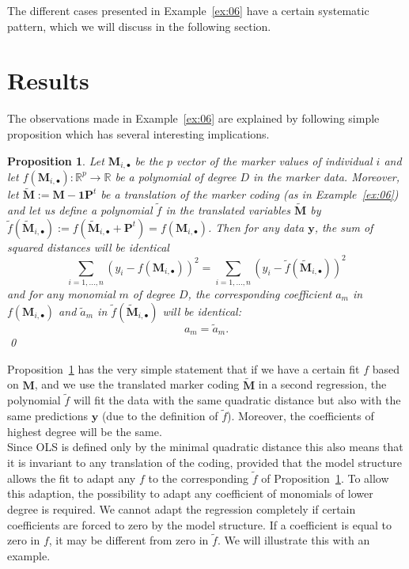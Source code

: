 \documentclass{bmcart}
\newtheorem{proposition}{Proposition}
\newcommand{\M}{\mathbf{M}}
\newcommand{\0}{\mathbf{0}}
\newcommand{\y}{\mathbf{y}}
\renewcommand{\P}{\mathbf{P}}
\begin{document}
The different cases presented in Example~\ref{ex:06} have a certain systematic pattern, which we will discuss in the following section. 


\section*{Results} 
The observations made in Example~\ref{ex:06} are explained by following simple proposition
which has several interesting implications.
\begin{proposition}\label{prop:01} Let $\M_{i,\bullet}$ be the $p$ vector of the marker values of individual $i$ and let $f(\M_{i,\bullet}): \mathbb{R}^p \rightarrow \mathbb{R}$ be a polynomial of degree $D$ in the marker data. Moreover, let $\tilde{\M}:= \M - \mathbf{1} \P^t$ be a translation of the marker coding (as in Example~\ref{ex:06}) and let us define a polynomial $\tilde{f}$ in the translated variables $\tilde{\M}$ by $\tilde{f}(\tilde{\M}_{i,\bullet}):= f(\tilde{\M}_{i,\bullet} +  \P^t)=f(\M_{i,\bullet})$. Then for any data $\y$, the sum of squared distances will be identical 
	$$ \sum_{i=1,...,n} (y_i - f(\M_{i,\bullet}))^2 = \sum_{i=1,...,n} (y_i - \tilde{f}(\tilde{\M}_{i,\bullet}))^2 $$
	and for any monomial $m$ of degree $D$, the corresponding coefficient $a_m$ in $f(\M_{i,\bullet})$ and $\tilde{a}_m$ in $\tilde{f}(\tilde{\M}_{i,\bullet})$ will be identical:
	$$a_m = \tilde{a}_m.$$ \qed
\end{proposition}
Proposition~\ref{prop:01} has the very simple statement that if we have a certain fit $f$ based on $\M$, and we use the translated marker coding $\tilde{\M}$ in a second regression, the polynomial $\tilde{f}$ will fit the data with the same quadratic distance but also with the same predictions $\hat{\y}$ (due to the definition of $\tilde{f}$). Moreover, the coefficients of highest degree will be the same.  \\

Since OLS is defined only by the minimal quadratic distance this also means that it is invariant to any translation of the coding, provided that the model structure allows the fit to 
adapt any $f$ to the corresponding $\tilde{f}$ of Proposition~\ref{prop:01}.
To allow this adaption, the possibility to adapt any coefficient of monomials of lower degree is required.
We cannot adapt the regression completely if certain coefficients are forced to zero by the model structure. If a coefficient is equal to zero in $f$, it may be different from zero in $\tilde{f}$.
We will illustrate this with an example. 
\end{document}
